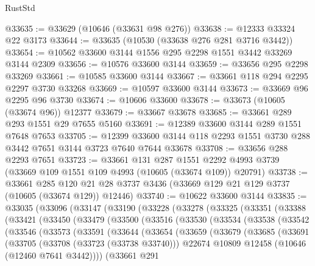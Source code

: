 \begin{lexlean}{RustStd}
\begin{coremodule}
@33635 := @33629 (@10646 (@33631 @98 @276))
@33638 := @12333 @33324 @22 @3173
@33644 := @33635 (@10530 (@33638 @276 @281 @3716 @3442))
@33654 := @10562 @33600 @3144 @1556 @295 @2298 @1551 @3442 @33269 @3144 @2309
@33656 := @10576 @33600 @3144
@33659 := @33656 @295 @2298 @33269
@33661 := @10585 @33600 @3144
@33667 := @33661 @118 @294 @2295 @2297 @3730 @33268
@33669 := @10597 @33600 @3144
@33673 := @33669 @96 @2295 @96 @3730
@33674 := @10606 @33600
@33678 := @33673 (@10605 (@33674 @96)) @12377
@33679 := @33667 @33678
@33685 := @33661 @289 @293 @1551 @29 @7655 @5160
@33691 := @12389 @33600 @3144 @289 @1551 @7648 @7653
@33705 := @12399 @33600 @3144 @118 @2293 @1551 @3730 @288 @3442 @7651 @3144 @3723 @7640 @7644 @33678
@33708 := @33656 @288 @2293 @7651
@33723 := @33661
    @131
    @287
    @1551
    @2292
    @4993
    @3739
    (@33669 @109 @1551 @109 @4993 (@10605 (@33674 @109)) @20791)
@33738 := @33661
    @285
    @120
    @21
    @28
    @3737
    @3436
    (@33669 @129 @21 @129 @3737 (@10605 (@33674 @129)) @12446)
@33740 := @10622 @33600 @3144
@33835 := @33035
    (@33096
      (@33147
        (@33190
          (@33228
            (@33278
              (@33325
                (@33351
                  (@33388
                    (@33421
                      (@33450
                        (@33479
                          (@33500
                            (@33516
                              (@33530
                                (@33534
                                  (@33538
                                    (@33542
                                      (@33546
                                        (@33573
                                          (@33591
                                            (@33644
                                              (@33654
                                                (@33659
                                                  (@33679
                                                    (@33685
                                                      (@33691
                                                        (@33705
                                                          (@33708 (@33723 (@33738 @33740)))
                                                          @22674
                                                          @10809
                                                          @12458
                                                          (@10646 (@12460 @7641 @3442))))
                                                      (@33661
                                                        @291

\end{coremodule}
\end{lexlean}
